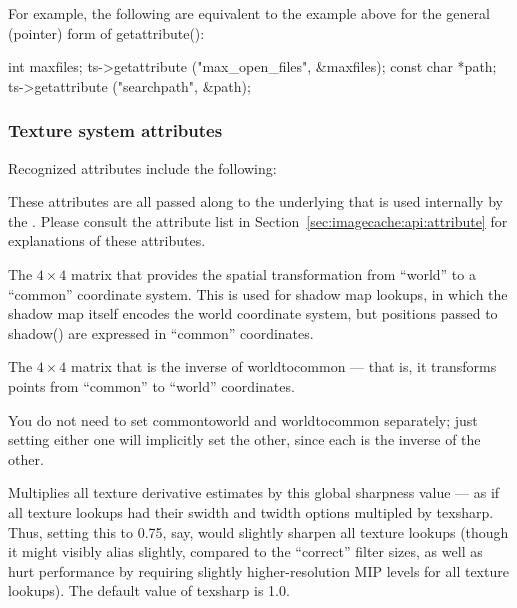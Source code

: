For example, the following are equivalent to the example above for the
general (pointer) form of {\cf getattribute()}:

\begin{code}
      int maxfiles;
      ts->getattribute ("max_open_files", &maxfiles);
      const char *path;
      ts->getattribute ("searchpath", &path);
\end{code}

\apiend


\subsubsection*{Texture system attributes}
\label{sec:texturesys:attributes}

Recognized attributes include the following:


These attributes are all passed along to the underlying \ImageCache that
is used internally by the \TextureSystem.  Please consult the
\ImageCache attribute list in Section~\ref{sec:imagecache:api:attribute}
for explanations of these attributes.

\apiend

The $4 \times 4$ matrix that provides the spatial transformation
from ``world'' to a ``common'' coordinate system.  This is used for
shadow map lookups, in which the shadow map itself encodes the
world coordinate system, but positions passed to {\cf shadow()} are
expressed in ``common'' coordinates.
\apiend

The $4 \times 4$ matrix that is the inverse of {\cf worldtocommon} ---
that is, it transforms points from ``common'' to ``world'' coordinates.

You do not need to set {\cf commontoworld} and {\cf worldtocommon}
separately; just setting either one will implicitly set the other, since
each is the inverse of the other.
\apiend

Multiplies all texture derivative estimates by this global sharpness 
value --- as if all texture lookups had their {\cf swidth} and {\cf twidth} 
options multipled by {\cf texsharp}.  Thus, setting this to 0.75, say,
would slightly sharpen all texture lookups (though it might visibly
alias slightly, compared to the ``correct'' filter sizes, as well
as hurt performance by requiring slightly higher-resolution MIP
levels for all texture lookups).
The default value of {\cf texsharp} is 1.0.  
\apiend

